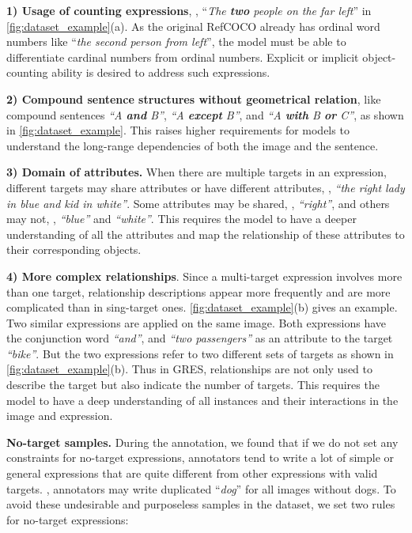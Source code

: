 \documentclass[10pt,twocolumn,letterpaper]{article}
\begin{document}
\vspace{2pt}\noindent\textbf{1) Usage of counting expressions}, \eg, ``\textit{The \textbf{two} people on the far left}'' in \cref{fig:dataset_example}(a). As the original RefCOCO already has ordinal word numbers like ``\textit{the \textit{second} person from left}'', the model must be able to differentiate cardinal numbers from ordinal numbers. Explicit or implicit object-counting ability is desired to address such expressions.

\vspace{2pt}\noindent\textbf{2) Compound sentence structures without geometrical relation}, like compound sentences \textit{``A \textbf{and} B''}, \textit{``A \textbf{except} B''}, and \textit{``A \textbf{with} B \textbf{or} C''}, as shown in \cref{fig:dataset_example}. This raises higher requirements for models to understand the long-range dependencies of both the image and the sentence.

\vspace{2pt}\noindent\textbf{3) Domain of attributes.} When there are multiple targets in an expression, different targets may share attributes or have different attributes, \eg, \textit{``the right lady in blue and kid in white''}. Some attributes may be shared, \eg, \textit{``right''}, and others may not, \eg, \textit{``blue''} and \textit{``white''}.
This requires the model to have a deeper understanding of all the attributes and map the relationship of these attributes to their corresponding objects. 

 \vspace{2pt}\noindent\textbf{4) More complex relationships}. Since a multi-target expression involves more than one target, relationship descriptions appear more frequently and are more complicated than in sing-target ones. 
\cref{fig:dataset_example}(b) gives an example. 
Two similar expressions are applied on the same image. Both expressions have the conjunction word \textit{``and''}, and \textit{``two passengers''} as an attribute to the target \textit{``bike''}. 
But the two expressions refer to two different sets of targets as shown in \cref{fig:dataset_example}(b).
Thus in GRES, relationships are not only used to describe the target but also indicate the number of targets. This requires the model to have a deep understanding of all instances and their interactions in the image and expression.


 \vspace{2pt} \textbf{No-target samples.} {During the annotation, we found that if we do not set any constraints for no-target expressions, annotators tend to write a lot of simple or general expressions that are quite different from other expressions with valid targets. \Eg, annotators may write duplicated ``\textit{dog}'' for all images without dogs. 
To avoid these undesirable and purposeless samples in the dataset,
we set two rules for no-target expressions:}
\end{document}
